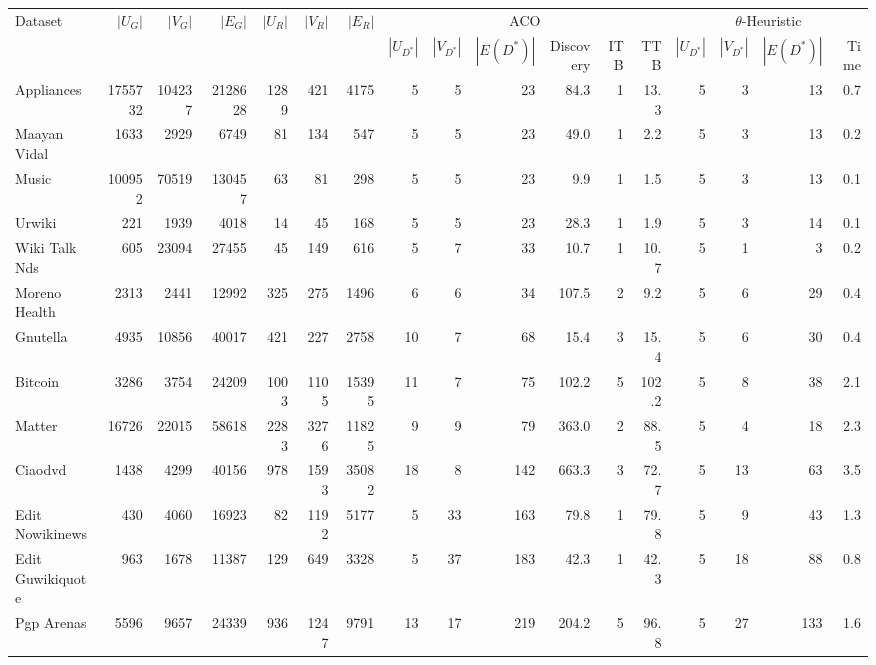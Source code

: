 \documentclass{article}
\begin{document}
\begin{landscape}
\begin{table}[htbp]
      \centering
      \setlength{\tabcolsep}{3.5pt} %
      \begin{tabular}{l *{16}{r}} %
        \toprule
        Dataset & $|U_G|$ & $|V_G|$ & $|E_G|$ & $|U_R|$ & $|V_R|$ & $|E_R|$ & \multicolumn{6}{c}{ACO} & \multicolumn{4}{c}{$\theta$-Heuristic} \\
        \cmidrule(lr){8-13} \cmidrule(lr){14-17}
        & & & & & & & $|U_{D^*}|$ & $|V_{D^*}|$ & $|E(D^*)|$ & Discovery & ITB & TTB & $|U_{D^*}|$ & $|V_{D^*}|$ & $|E(D^*)|$ & Time \\
        \midrule
        Appliances & 1755732 & 104237 & 2128628 & 1289 & 421 & 4175 & 5 & 5 & 23 & 84.3 & 1 & 13.3 & 5 & 3 & 13 & 0.7 \\
        Maayan Vidal & 1633 & 2929 & 6749 & 81 & 134 & 547 & 5 & 5 & 23 & 49.0 & 1 & 2.2 & 5 & 3 & 13 & 0.2 \\
        Music & 100952 & 70519 & 130457 & 63 & 81 & 298 & 5 & 5 & 23 & 9.9 & 1 & 1.5 & 5 & 3 & 13 & 0.1 \\
        Urwiki & 221 & 1939 & 4018 & 14 & 45 & 168 & 5 & 5 & 23 & 28.3 & 1 & 1.9 & 5 & 3 & 14 & 0.1 \\
        Wiki Talk Nds & 605 & 23094 & 27455 & 45 & 149 & 616 & 5 & 7 & 33 & 10.7 & 1 & 10.7 & 5 & 1 & 3 & 0.2 \\
        Moreno Health & 2313 & 2441 & 12992 & 325 & 275 & 1496 & 6 & 6 & 34 & 107.5 & 2 & 9.2 & 5 & 6 & 29 & 0.4 \\
        Gnutella & 4935 & 10856 & 40017 & 421 & 227 & 2758 & 10 & 7 & 68 & 15.4 & 3 & 15.4 & 5 & 6 & 30 & 0.4 \\
        Bitcoin & 3286 & 3754 & 24209 & 1003 & 1105 & 15395 & 11 & 7 & 75 & 102.2 & 5 & 102.2 & 5 & 8 & 38 & 2.1 \\
        Matter & 16726 & 22015 & 58618 & 2283 & 3276 & 11825 & 9 & 9 & 79 & 363.0 & 2 & 88.5 & 5 & 4 & 18 & 2.3 \\
        Ciaodvd & 1438 & 4299 & 40156 & 978 & 1593 & 35082 & 18 & 8 & 142 & 663.3 & 3 & 72.7 & 5 & 13 & 63 & 3.5 \\
        Edit Nowikinews & 430 & 4060 & 16923 & 82 & 1192 & 5177 & 5 & 33 & 163 & 79.8 & 1 & 79.8 & 5 & 9 & 43 & 1.3 \\
        Edit Guwikiquote & 963 & 1678 & 11387 & 129 & 649 & 3328 & 5 & 37 & 183 & 42.3 & 1 & 42.3 & 5 & 18 & 88 & 0.8 \\
        Pgp Arenas & 5596 & 9657 & 24339 & 936 & 1247 & 9791 & 13 & 17 & 219 & 204.2 & 5 & 96.8 & 5 & 27 & 133 & 1.6 \\

\end{tabular}
\end{table}
\end{landscape}
\end{document}
